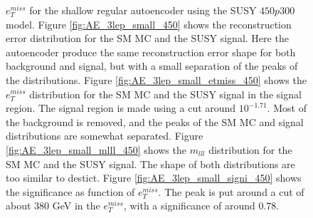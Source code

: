 \begin{figure}[H]
{    $e_T^{miss}$ for the shallow regular autoencoder using the SUSY $450p300$ model. Figure \ref{fig:AE_3lep_small_450} shows the reconstruction error 
    distribution for the SM MC and the SUSY signal. Here the autoencoder produce the same reconstruction error shape for both background and 
    signal, but with a small separation of the peaks of the distributions. Figure \ref{fig:AE_3lep_small_etmiss_450} shows the $e_T^{miss}$ 
    distribution for the SM MC and the SUSY signal in the signal region. The signal region is made using a cut around $10^{-1.71}$. Most of 
    the background is removed, and the peaks of the SM MC and signal distributions are somewhat separated. Figure 
    \ref{fig:AE_3lep_small_mlll_450} shows the $m_{lll}$ distribution for the SM MC and the SUSY signal. 
    The shape of both distributions are too similar to destict. Figure \ref{fig:AE_3lep_small_signi_450} shows the significance as 
    function of $e_T^{miss}$. The peak is put around a cut of about 380 GeV in the $e_T^{miss}$, with a significance of around $0.78$.}
    \label{fig:AE_3lep_small_rec_sig_signi_450}
\end{figure}








